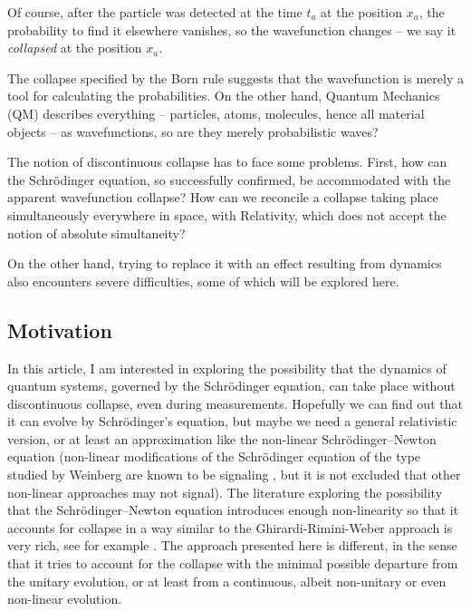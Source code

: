 \documentclass[12pt]{amsart}
\theoremstyle{definition}
\theoremstyle{plain}
\begin{document}
Of course, after the particle was detected at the time $t_a$ at the position $x_a$, the probability to find it elsewhere vanishes, so the wavefunction changes --  we say it \emph{collapsed} at the position $x_a$.

The collapse specified by the Born rule suggests that the wavefunction is merely a tool for calculating the probabilities.
On the other hand, Quantum Mechanics (QM) describes everything -- particles, atoms, molecules, hence all material objects -- as wavefunctions, so are they merely probabilistic waves?

The notion of discontinuous collapse has to face some problems. First, how can the Schr\"odinger equation, so successfully confirmed, be accommodated with the apparent wavefunction collapse? How can we reconcile a collapse taking place simultaneously everywhere in space, with Relativity, which does not accept the notion of absolute simultaneity?

On the other hand, trying to replace it with an effect resulting from dynamics also encounters severe difficulties, some of which will be explored here.

\subsection{Motivation}

In this article, I am interested in exploring the possibility that the dynamics of quantum systems, governed by the Schr\"odinger equation, can take place without discontinuous collapse, even during measurements. Hopefully we can find out that it can evolve by Schr\"odinger's equation, but maybe we need a general relativistic version, or at least an approximation like the non-linear Schr\"odinger--Newton equation \cite{RuffiniBonazzola1969SchrodingerNewtonEquation} (non-linear modifications of the Schr\"odinger equation of the type studied by Weinberg are known to be signaling \cite{gisin1990weinbergSignaling}, but it is not excluded that other non-linear approaches may not signal). The literature exploring the possibility that the Schr\"odinger--Newton equation introduces enough non-linearity so that it accounts for collapse in a way similar to the Ghirardi-Rimini-Weber approach \cite{GRW86} is very rich, see for example \cite{diosi1984gravitationQMlocalization,penrose1996gravityQuantumStateReduction}. The approach presented here is different, in the sense that it tries to account for the collapse with the minimal possible departure from the unitary evolution, or at least from a continuous, albeit non-unitary or even non-linear evolution.
\end{document}
